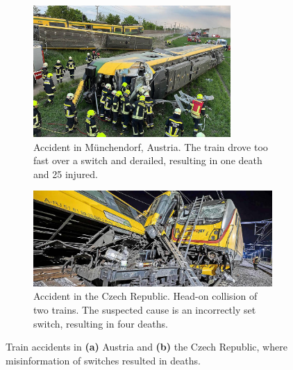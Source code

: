 \begin{figure}[H]
    \centering
    \begin{subfigure}{0.48\textwidth}
        \includegraphics[width=\linewidth, height=5cm, keepaspectratio]{PICs/Introduction/unfallMuenchedorf.jpg}
        \caption{Accident in Münchendorf, Austria. The train drove too fast over a switch and derailed, resulting in one death and 25 injured. \cite{zugUnfall1Tod}}
        \label{fig:unfallMuenchedorf}
    \end{subfigure}
    \hfill
    \begin{subfigure}{0.48\textwidth}
        \includegraphics[width=\linewidth, trim={13cm 0cm 5cm 0cm}, clip]{PICs/Introduction/unfallTschechien.jpg} %
        \caption{Accident in the Czech Republic. Head-on collision of two trains. The suspected cause is an incorrectly set switch, resulting in four deaths. \cite{zugUnfallFrontal}}
        \label{fig:unfallTschechien}
    \end{subfigure}
    \caption{Train accidents in \textbf{(a)} Austria and \textbf{(b)} the Czech Republic, where misinformation of switches resulted in deaths.}
    \label{fig:zugUnfaelle}
\end{figure}

